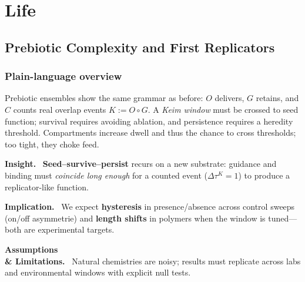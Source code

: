 \documentclass[12pt,a4paper,oneside]{scrreprt}
\newenvironment{insight}{\par\vspace{0.5em}\noindent\textbf{Insight.}\ }{\par\vspace{0.5em}}
\newenvironment{implication}{\par\vspace{0.5em}\noindent\textbf{Implication.}\ }{\par\vspace{0.5em}}
\newenvironment{limitation}{\par\vspace{0.5em}\noindent\textbf{Assumptions \\ \& Limitations.}\ }{\par\vspace{0.5em}}
\begin{document}
\part{Life}

\chapter{Prebiotic Complexity and First Replicators}\label{ch:life-prebiotic}

\section*{Plain-language overview}
Prebiotic ensembles show the same grammar as before: $O$ delivers, $G$ retains, and $C$ counts real overlap events $K:=O\!\circ G$. 
A \emph{Keim window} must be crossed to seed function; survival requires avoiding ablation, and persistence requires a heredity threshold. 
Compartments increase dwell and thus the chance to cross thresholds; too tight, they choke feed. 

\begin{insight}
\textbf{Seed–survive–persist} recurs on a new substrate: guidance and binding must \emph{coincide long enough} for a counted event ($\Delta\tau^K=1$) to produce a replicator-like function.
\end{insight}

\begin{implication}
We expect \textbf{hysteresis} in presence/absence across control sweeps (on/off asymmetrie) and \textbf{length shifts} in polymers when the window is tuned—both are experimental targets.
\end{implication}

\begin{limitation}
Natural chemistries are noisy; results must replicate across labs and environmental windows with explicit null tests.
\end{limitation}
\end{document}
